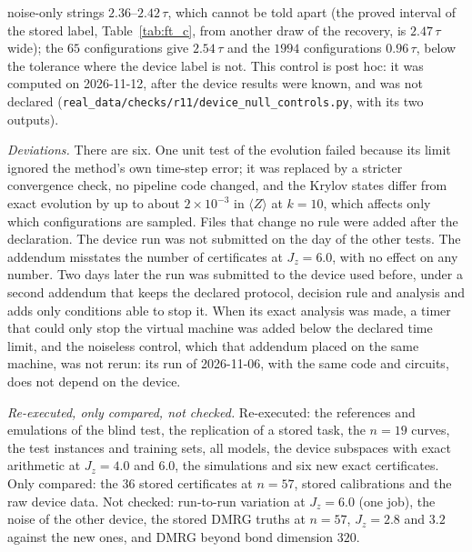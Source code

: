 \documentclass[aps,prx,onecolumn,10pt,nofootinbib,longbibliography,floatfix]{revtex4-2}
\theoremstyle{remark}
\newcommand{\Jz}{J_z}
\begin{document}
noise-only strings $2.36$--$2.42\,\tau$, which cannot be told apart (the proved interval of the stored label, Table~\ref{tab:ft_c}, from another draw of the recovery, is $2.47\,\tau$ wide); the $65$ configurations give $2.54\,\tau$ and %
the $1994$ configurations $0.96\,\tau$, below the tolerance where the device label is not. This control is post hoc: %
it was computed on 2026-11-12, after the device results were known, and was not declared %
(\texttt{real\_data/checks/r11/device\_null\_controls.py}, with its two outputs).

\emph{Deviations.} There are six. One unit test of the evolution failed because its limit ignored the method's own time-step
error; it was replaced by a stricter convergence check, no pipeline code changed, and the Krylov states differ from exact
evolution by up to about $2\times10^{-3}$ in $\langle Z\rangle$ at $k=10$, which affects only which configurations are sampled. %
Files that change no rule were added after the declaration. The device run was not submitted on the day of the other
tests. The addendum misstates the number of certificates at $\Jz=6.0$, with no effect on any number. Two days later the %
run was submitted to the device used before, under a second addendum that keeps the declared protocol, decision rule
and analysis and adds only conditions able to stop it. When its exact analysis was made, a timer that could only stop
the virtual machine was added below the declared time limit, and the noiseless control, which that addendum placed on
the same machine, was not rerun: its run of 2026-11-06, with the same code and circuits, does not depend on the device. %

\emph{Re-executed, only compared, not checked.} Re-executed: the references and emulations of the blind test, the
replication of a stored task, the $n=19$ curves, the test instances and training sets, all models, the device subspaces
with exact arithmetic at $\Jz=4.0$ and $6.0$, the simulations and six new exact certificates. Only compared: the $36$ %
stored certificates at $n=57$, stored calibrations and the raw device data. Not checked: run-to-run variation at %
$\Jz=6.0$ (one job), the noise of the %
other device, the stored DMRG truths at $n=57$, $\Jz=2.8$ and $3.2$ against the new ones, and DMRG beyond bond dimension $320$. %
\end{document}
